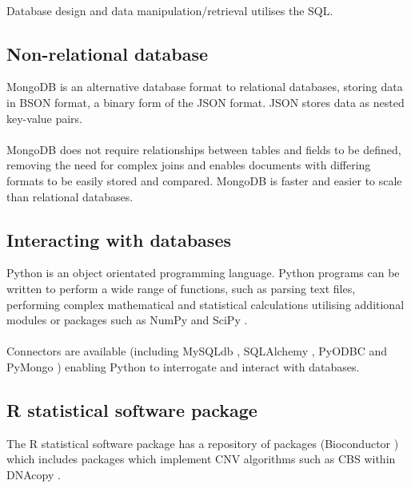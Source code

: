 \paragraph*{}
Database design and data manipulation/retrieval utilises the \ac{SQL}. 

\subsection{Non-relational database}
MongoDB \cite{mongodb_inc._mongodb_????} is an alternative database format to relational databases, storing data in BSON format, a binary form of the JSON format. JSON stores data as nested key-value pairs. 
\paragraph*{}
MongoDB does not require relationships between tables and fields to be defined, removing the need for complex joins and enables documents with differing formats to be easily stored and compared. MongoDB is faster and easier to scale than relational databases.

\subsection{Interacting with databases}
Python is an object orientated programming language. Python programs can be written to perform a wide range of functions, such as parsing text files, performing complex mathematical and statistical calculations utilising additional modules or packages such as NumPy \cite{vanderwalt2011} and SciPy \cite{scipy_scipyorg_????}.
\paragraph*{}
Connectors are available (including MySQLdb \cite{dustman2014}, SQLAlchemy \cite{bayer_sqlalchemy_????}, PyODBC \cite{pyodbc_mkleehammer/pyodbc_????} and PyMongo \cite{pymongo_python_????}) enabling Python to interrogate and interact with databases.

\subsection{R statistical software package}
The R statistical software package \cite{rfoundationforstatisticalcomputing2014} has a repository of packages (Bioconductor \cite{huber_orchestrating_2015}) which includes packages which implement CNV algorithms such as \ac{CBS} within DNAcopy \cite{Sechan2015}.  